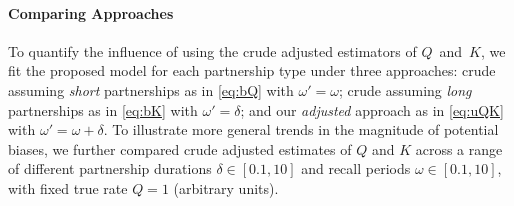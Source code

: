 \paragraph{Comparing Approaches}
To quantify the influence of using
the crude \vs adjusted estimators of $Q$~and~$K$,
we fit the proposed model for each partnership type under three approaches:
crude assuming \emph{short} partnerships as in \eqref{eq:bQ} with $\omega' = \omega$;
crude assuming \emph{long} partnerships as in \eqref{eq:bK} with $\omega' = \delta$; and
our \emph{adjusted} approach as in \eqref{eq:uQK} with $\omega' = \omega + \delta$.
To illustrate more general trends in the magnitude of potential biases,
we further compared crude \vs adjusted estimates of $Q$ and $K$ across a range of different
partnership durations $\delta \in [0.1, 10]$ and
recall periods $\omega \in [0.1, 10]$,
with fixed true rate $Q = 1$ (arbitrary units).
